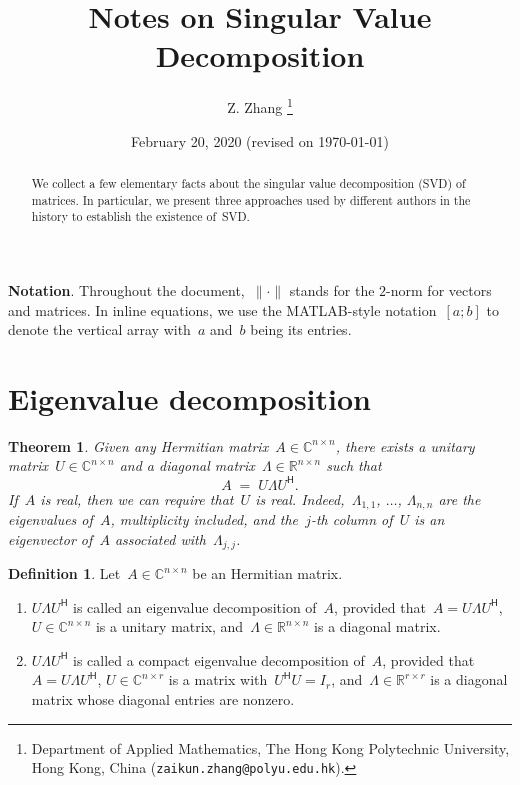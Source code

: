 \documentclass[11pt,a4paper]{article}
\title{Notes on Singular Value Decomposition}
\date{February 20, 2020 (revised on \today)}
\author{
Z. Zhang
\thanks{
Department of Applied Mathematics, The Hong Kong Polytechnic University, 
Hong Kong, China ({\tt zaikun.zhang@polyu.edu.hk}).
}
}
\newtheorem{theorem}{Theorem}%
\theoremstyle{definition}
\newtheorem{definition}{Definition}%
\def\real{\mathbb{R}}
\def\CC{\mathbb{C}}
\newcommand{\hmt}{{\scriptscriptstyle{{\mathsf{H}}}}}
\begin{document}
\maketitle

\begin{abstract}
  We collect a few elementary facts about the singular value decomposition (SVD) of matrices. In
  particular, we present three approaches used by different authors in the history 
  to establish the existence of~SVD.
\end{abstract}

\textbf{Notation}. Throughout the document,~$\|\cdot\|$ stands for the $2$-norm for vectors and matrices. 
In inline equations, we use the MATLAB-style notation~$[a; b]$ to denote the vertical array 
with~$a$ and~$b$ being its entries. 

\section{Eigenvalue decomposition}

\begin{theorem}
  \label{th:evd}
  Given any Hermitian matrix~$A\in \CC^{n\times n}$, there exists a unitary matrix~$U\in
  \CC^{n\times n}$ and a diagonal matrix~$\Lambda \in \real^{n\times n}$ such that 
  \begin{equation*}
    A \; = \; U\Lambda U^\hmt.
  \end{equation*}
  If~$A$ is real, then we can require that~$U$ is real.
  Indeed,~$\Lambda_{1,1}$, $\dots$, $\Lambda_{n,n}$ are the eigenvalues of~$A$, multiplicity
  included, and the~$j$-th column of~$U$ is an eigenvector of~$A$ associated with~$\Lambda_{j,j}$.
\end{theorem}

\begin{definition}
  \label{def:evd}
  Let~$A\in \CC^{n\times n}$ be an Hermitian matrix. 
  \begin{enumerate}[leftmargin=1.5em]
    \item 
      $U\Lambda U^\hmt$ is called an eigenvalue decomposition of~$A$, provided that~$A = U \Lambda U^\hmt$, $U
      \in \CC^{n\times n}$ is a unitary matrix, and~$\Lambda \in \real^{n\times n}$ is a diagonal
      matrix.
    \item 
      $U\Lambda U^\hmt$ is called a compact eigenvalue decomposition of~$A$,
      provided that~$A = U \Lambda U^\hmt$, $U \in \CC^{n\times r}$ is a matrix with~$U^\hmt U = I_r$,
      and~$\Lambda \in \real^{r\times r}$ is a diagonal matrix whose diagonal entries are nonzero.
  \end{enumerate}
\end{definition}
\end{document}
